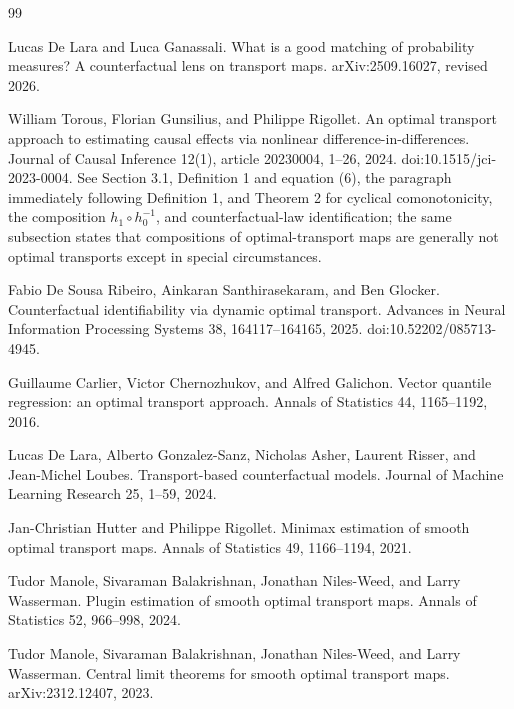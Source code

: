 \documentclass{article}
\begin{document}
\begin{thebibliography}{99}

   Lucas De Lara and Luca Ganassali. What is a good matching of probability measures? A counterfactual lens on transport maps. arXiv:2509.16027, revised 2026.

   William Torous, Florian Gunsilius, and Philippe Rigollet. An optimal transport approach to estimating causal effects via nonlinear difference-in-differences. Journal of Causal Inference 12(1), article 20230004, 1--26, 2024. doi:10.1515/jci-2023-0004. See Section 3.1, Definition 1 and equation (6), the paragraph immediately following Definition 1, and Theorem 2 for cyclical comonotonicity, the composition \(h_1\circ h_0^{-1}\), and counterfactual-law identification; the same subsection states that compositions of optimal-transport maps are generally not optimal transports except in special circumstances.

   Fabio De Sousa Ribeiro, Ainkaran Santhirasekaram, and Ben Glocker. Counterfactual identifiability via dynamic optimal transport. Advances in Neural Information Processing Systems 38, 164117--164165, 2025. doi:10.52202/085713-4945.

   Guillaume Carlier, Victor Chernozhukov, and Alfred Galichon. Vector quantile regression: an optimal transport approach. Annals of Statistics 44, 1165--1192, 2016.

   Lucas De Lara, Alberto Gonzalez-Sanz, Nicholas Asher, Laurent Risser, and Jean-Michel Loubes. Transport-based counterfactual models. Journal of Machine Learning Research 25, 1--59, 2024.

   Jan-Christian Hutter and Philippe Rigollet. Minimax estimation of smooth optimal transport maps. Annals of Statistics 49, 1166--1194, 2021.

   Tudor Manole, Sivaraman Balakrishnan, Jonathan Niles-Weed, and Larry Wasserman. Plugin estimation of smooth optimal transport maps. Annals of Statistics 52, 966--998, 2024.

   Tudor Manole, Sivaraman Balakrishnan, Jonathan Niles-Weed, and Larry Wasserman. Central limit theorems for smooth optimal transport maps. arXiv:2312.12407, 2023.


\end{thebibliography}
\end{document}

